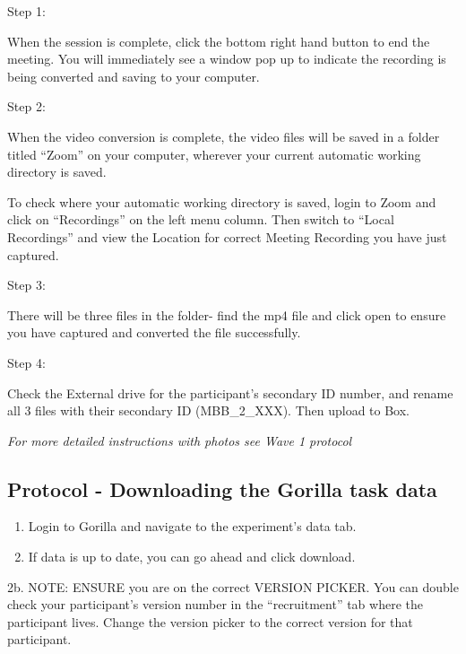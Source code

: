 \documentclass[]{book}
\begin{document}
Step 1:

When the session is complete, click the bottom right hand button to end the meeting. You will immediately see a window pop up to indicate the recording is being converted and saving to your computer.

Step 2:

When the video conversion is complete, the video files will be saved in a folder titled ``Zoom'' on your computer, wherever your current automatic working directory is saved.

To check where your automatic working directory is saved, login to Zoom and click on ``Recordings'' on the left menu column. Then switch to ``Local Recordings'' and view the Location for correct Meeting Recording you have just captured.

Step 3:

There will be three files in the folder- find the mp4 file and click open to ensure you have captured and converted the file successfully.

Step 4:

Check the External drive for the participant's secondary ID number, and rename all 3 files with their secondary ID (MBB\_2\_XXX). Then upload to Box.

\emph{For more detailed instructions with photos see Wave 1 protocol}

\hypertarget{protocol---downloading-the-gorilla-task-data-2}{%
\subsection{Protocol - Downloading the Gorilla task data}\label{protocol---downloading-the-gorilla-task-data-2}}

\begin{enumerate}
\def\labelenumi{\arabic{enumi}.}
\item
  Login to Gorilla and navigate to the experiment's data tab.
\item
  If data is up to date, you can go ahead and click download.
\end{enumerate}

2b. NOTE: ENSURE you are on the correct VERSION PICKER. You can double check your participant's version number in the ``recruitment'' tab where the participant lives. Change the version picker to the correct version for that participant.
\end{document}

